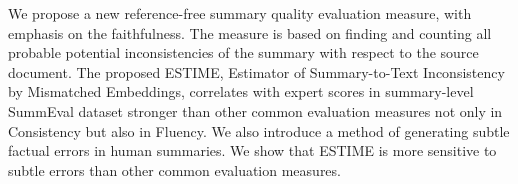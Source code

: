 We propose a new reference-free summary quality evaluation measure, with emphasis on the faithfulness. The measure is based on finding and counting all probable potential inconsistencies of the summary with respect to the source document. The proposed ESTIME, Estimator of Summary-to-Text Inconsistency by Mismatched Embeddings, correlates with expert scores in summary-level SummEval dataset stronger than other common evaluation measures not only in Consistency but also in Fluency. We also introduce a method of generating subtle factual errors in human summaries. We show that ESTIME is more sensitive to subtle errors than other common evaluation measures.
